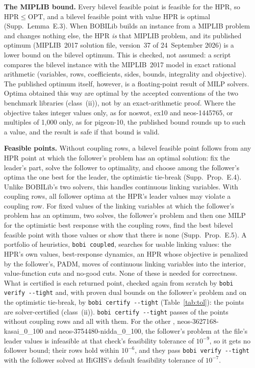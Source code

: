 \documentclass[]{spie}  %
\theoremstyle{plain}
\newcommand{\code}[1]{\texttt{#1}}
\newcommand{\inst}[1]{\mbox{#1}}             %
\newcommand{\OPT}{\mathrm{OPT}}
\newcommand{\HPR}{\mathrm{HPR}}
\newcommand{\cls}[1]{class~(#1)}             %
\begin{document}
\textbf{The MIPLIB bound.} Every bilevel feasible point is feasible for the HPR, so $\HPR\le\OPT$,
and a bilevel feasible point with value $\HPR$ is optimal (Supp.\ Lemma~E.3). When BOBILib
builds an instance from a MIPLIB problem and changes nothing else, the HPR \emph{is} that MIPLIB
problem, and its published optimum (MIPLIB~2017 solution file, version~37 of 24~September
2026)\cite{gleixner2021miplib} is a lower bound on the bilevel
optimum. This is checked, not assumed: a script compares the bilevel instance with the
MIPLIB~2017 model in exact rational arithmetic (variables, rows, coefficients, sides, bounds,
integrality and objective). The published optimum itself, however, is a floating-point result of
MILP solvers. Optima obtained this way are optimal by the accepted conventions of the two
benchmark libraries (\cls{ii}), not by an exact-arithmetic proof. Where the objective takes integer
values only, as for \inst{noswot}, \inst{ex10} and \inst{neos-1445765}, or multiples of 1,000 only,
as for \inst{pigeon-10}, the published bound rounds up to such a value, and the result is safe if
that bound is valid.

\textbf{Feasible points.} Without coupling rows, a bilevel feasible point follows from any HPR
point at which the follower's problem has an optimal solution: fix the leader's part, solve the
follower to optimality, and choose among the follower's optima the one best for the leader, the
optimistic tie-break (Supp.\ Prop.~E.4). Unlike BOBILib's two solvers, this handles continuous
linking variables. With coupling rows, all follower optima at the HPR's leader values may violate
a coupling row. For fixed values of the linking variables at which the follower's problem has an
optimum, two solves, the follower's problem and then one MILP for the optimistic best response
with the coupling rows, find the best bilevel feasible point with those values or show that there
is none (Supp.\ Prop.~E.5). A portfolio of heuristics, \code{bobi coupled}, searches for usable
linking values: the HPR's own values, best-response dynamics, an HPR whose objective is penalized
by the follower's, PADM,\cite{kleinert2021computing} moves of continuous linking variables into
the interior, value-function cuts\cite{mitsos2010global,lozano2017value} and no-good cuts. None
of these is needed for correctness. What is certified is each returned point, checked again from
scratch by \code{bobi verify -{}-tight} and, with proven dual bounds on the follower's problem and
on the optimistic tie-break, by \code{bobi certify -{}-tight} (Table~\ref{tab:tol}): the points are
solver-certified (\cls{ii}). \code{bobi certify -{}-tight} passes \NumGeneralTightCertified{} of the
\NumGeneralFiles{} points without coupling rows and all \NumCoupledTightCertified{} with them. For
the other \NumGeneralTightNoBound{}, \inst{neos-3627168-kasai\_0\_100} and
\inst{neos-3754480-nidda\_0\_100}, the follower's problem at the file's leader values is infeasible
at that check's feasibility tolerance of $10^{-9}$, so it gets no follower bound; their rows hold
within $10^{-6}$, and they pass \code{bobi verify -{}-tight} with the follower solved at HiGHS's
default feasibility tolerance of $10^{-7}$.
\end{document}
